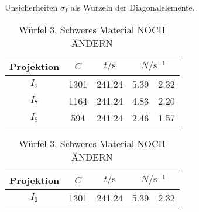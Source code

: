 Unsicherheiten $\sigma_I$ als Wurzeln der Diagonalelemente.
\FloatBarrier
\begin{table}[h]
    \centering
    \caption{Würfel 3, Schweres Material NOCH ÄNDERN}
    \label{tab:W3}
    \begin{tabular}{c S[table-format=4.0] S[table-format=3.2] S[table-format=1.2]@{${}\pm{}$} S[table-format=1.2]}
        \toprule
        {Projektion} & {$C$} & {$t/\si{\s}$} &  \\
        \midrule
        $I_2$ & 1301 & 241.24 & 5.39 & 2.32 \\
        $I_7$ & 1164 & 241.24 & 4.83 & 2.20 \\
        $I_8$ & 594  & 241.24 & 2.46 & 1.57 \\
        \bottomrule
    \end{tabular}
\end{table}
\FloatBarrier
\noindent
\FloatBarrier
\begin{table}[h]
    \centering
    \caption{Würfel 3, Schweres Material NOCH ÄNDERN}
    \label{tab:W3}
    \begin{tabular}{c S[table-format=4.0] S[table-format=3.2] S[table-format=1.2]@{${}\pm{}$} S[table-format=1.2]}
        \toprule
        {Projektion} & {$C$} & {$t/\si{\s}$} &  \\
        \midrule
        $I_2$ & 1301 & 241.24 & 5.39 & 2.32 \\

        \bottomrule
    \end{tabular}
\end{table}
\FloatBarrier
\noindent
